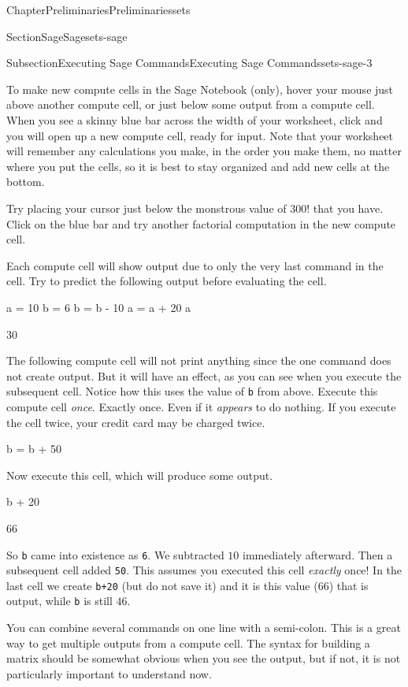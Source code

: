 \documentclass[oneside,10pt,]{book}
\newcommand{\mono}[1]{\texttt{#1}}
\numberwithin{equation}{section}
\begin{document}
\begin{chapterptx}{Chapter}{Preliminaries}{}{Preliminaries}{}{}{sets}
\begin{sectionptx}{Section}{Sage}{}{Sage}{}{}{sets-sage}
\begin{subsectionptx}{Subsection}{Executing Sage Commands}{}{Executing Sage Commands}{}{}{sets-sage-3}
\par
To make new compute cells in the Sage Notebook (only), hover your mouse just above another compute cell, or just below some output from a compute cell.  When you see a skinny blue bar across the width of your worksheet, click and you will open up a new compute cell, ready for input.  Note that your worksheet will remember any calculations you make, in the order you make them, no matter where you put the cells, so it is best to stay organized and add new cells at the bottom.%
\par
Try placing your cursor just below the monstrous value of \(300!\) that you have.  Click on the blue bar and try another factorial computation in the new compute cell.%
\par
Each compute cell will show output due to only the very last command in the cell.  Try to predict the following output before evaluating the cell.%
\begin{sageinput}
a = 10
b = 6
b = b - 10
a = a + 20
a
\end{sageinput}
\begin{sageoutput}
30
\end{sageoutput}
The following compute cell will not print anything since the one command does not create output.  But it will have an effect, as you can see when you execute the subsequent cell.  Notice how this uses the value of \mono{b} from above.  Execute this compute cell \emph{once}.  Exactly once.  Even if it \emph{appears} to do nothing.  If you execute the cell twice, your credit card may be charged twice.%
\begin{sageinput}
b = b + 50
\end{sageinput}
Now execute this cell, which will produce some output.%
\begin{sageinput}
b + 20
\end{sageinput}
\begin{sageoutput}
66
\end{sageoutput}
So \mono{b} came into existence as \mono{6}.  We subtracted \(10\) immediately afterward.  Then a subsequent cell added \mono{50}.  This assumes you executed this cell \emph{exactly} once!  In the last cell we create \mono{b+20} (but do not save it) and it is this value (\(66\)) that is output, while \mono{b} is still \(46\).%
\par
You can combine several commands on one line with a semi-colon.  This is a great way to get multiple outputs from a compute cell.  The syntax for building a matrix should be somewhat obvious when you see the output, but if not, it is not particularly important to understand now.%

\end{subsectionptx}
\end{sectionptx}
\end{chapterptx}
\end{document}

